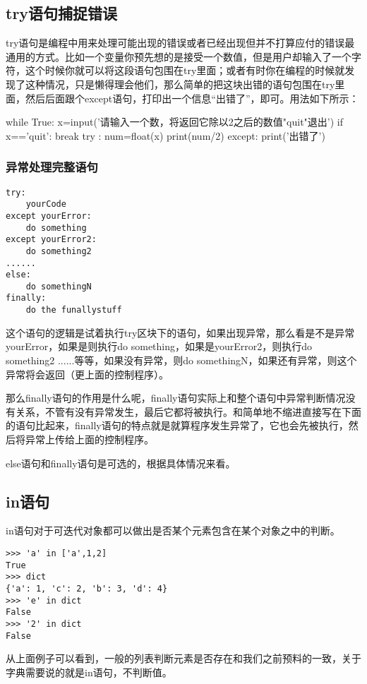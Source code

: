 \documentclass[12pt,oneside]{book}
\begin{document}
\begin{common-format}
\subsection{try语句捕捉错误}
try语句是编程中用来处理可能出现的错误或者已经出现但并不打算应付的错误最通用的方式。比如一个变量你预先想的是接受一个数值，但是用户却输入了一个字符，这个时候你就可以将这段语句包围在try里面；或者有时你在编程的时候就发现了这种情况，只是懒得理会他们，那么简单的把这块出错的语句包围在try里面，然后后面跟个except语句，打印出一个信息“出错了”，即可。用法如下所示：
\begin{tcbpython}
while True:
    x=input('请输入一个数，将返回它除以2之后的数值"quit"退出\n')
    if x=='quit':
        break
    try :
        num=float(x)
        print(num/2)
    except:
        print('出错了')
\end{tcbpython}

\subsubsection{异常处理完整语句}
\begin{Verbatim}
try:
    yourCode
except yourError:
    do something
except yourError2:
    do something2
......
else:
    do somethingN
finally:
    do the funallystuff
\end{Verbatim}

这个语句的逻辑是试着执行try区块下的语句，如果出现异常，那么看是不是异常yourError，如果是则执行do something，如果是yourError2，则执行do something2 ......等等，如果没有异常，则do somethingN，如果还有异常，则这个异常将会返回（更上面的控制程序）。

那么finally语句的作用是什么呢，finally语句实际上和整个语句中异常判断情况没有关系，不管有没有异常发生，最后它都将被执行。和简单地不缩进直接写在下面的语句比起来，finally语句的特点就是就算程序发生异常了，它也会先被执行，然后将异常上传给上面的控制程序。

else语句和finally语句是可选的，根据具体情况来看。

\subsection{in语句}
in语句对于可迭代对象都可以做出是否某个元素包含在某个对象之中的判断。
\begin{Verbatim}
>>> 'a' in ['a',1,2]
True
>>> dict
{'a': 1, 'c': 2, 'b': 3, 'd': 4}
>>> 'e' in dict
False
>>> '2' in dict
False
\end{Verbatim}
从上面例子可以看到，一般的列表判断元素是否存在和我们之前预料的一致，关于字典需要说的就是in语句，不判断值。



\end{common-format}
\end{document}
